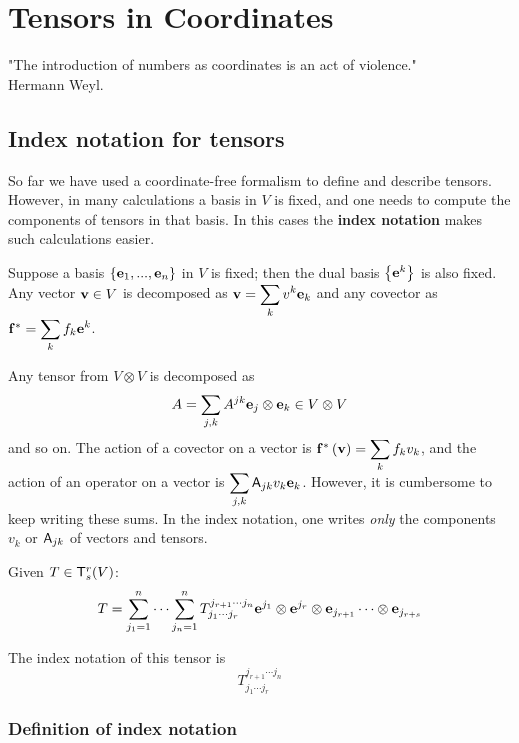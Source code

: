 \chapter{Tensors in Coordinates}

\begin{flushright}
 "The introduction of numbers as coordinates is an act of violence." \\ Hermann Weyl.

\end{flushright}




\section{Index notation for tensors\label{sub:Index-notation}}

So far we have used a coordinate-free formalism to define and
describe tensors. However, in
many calculations a basis in $V$ is fixed, and one needs to compute
the components of tensors in that basis. 
In this cases the \textbf{index notation} makes such calculations easier.

Suppose a basis $\left\{ \mathbf{ e}_{1},...,\mathbf{ e}_{n}\right\} $
in $V$ is fixed; then the dual basis $\left\{ \mathbf{ e}^{k}\right\} $
is also fixed. Any vector $\mathbf{ v}\in V$ is decomposed as $\mathbf{ v}=\displaystyle\sum_{k}v^{k}\mathbf{ e}_{k}$
and any covector as $\mathbf{ f}^{*}=\displaystyle\sum_{k}f_{k}\mathbf{ e}^{k}$.

Any tensor from $V\otimes V$ is decomposed as\[
A=\displaystyle\sum_{j,k}A^{jk}\mathbf{ e}_{j}\otimes\mathbf{ e}_{k}\in V\otimes V\]
and so on. The action of a covector on a vector is $\mathbf{ f}^{*}\left(\mathbf{ v}\right)=\displaystyle\sum_{k}f_{k}v_{k}$,
and the action of an operator on a vector is $\displaystyle\sum_{j,k}\mathsf{A}_{jk}v_{k}\mathbf{ e}_{k}$.
However, it is cumbersome to keep writing these sums. In the index
notation, one writes \emph{only} the components $v_{k}$ or $\mathsf{A}_{jk}$
of vectors and tensors.


\begin{df}
 Given $T \in \mathsf{T}^r_s(V)$:
\[T=\displaystyle\sum_{j_1=1}^{n} \cdots \displaystyle\sum_{j_n=1}^{n}  T_{j_1\cdots j_r} ^{j_{r+1}\cdots j_n} \mathbf{ e}^{j_1}\otimes \mathbf{ e}^{j_r} \otimes \mathbf{ e}_{j_{r+1}} \cdots \otimes \mathbf{ e}_{j_{r+s}}
\]

The index notation of this tensor is
\[ T_{j_1\cdots j_r} ^{j_{r+1}\cdots j_n} \]
\end{df}




\subsection{Definition of  index notation}

